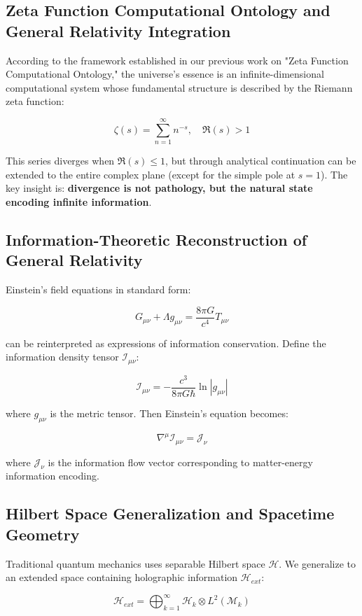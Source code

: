 \documentclass[12pt,a4paper]{article}
\begin{document}
\subsection{Zeta Function Computational Ontology and General Relativity Integration}

According to the framework established in our previous work on "Zeta Function Computational Ontology," the universe's essence is an infinite-dimensional computational system whose fundamental structure is described by the Riemann zeta function:

$$\zeta(s) = \sum_{n=1}^{\infty} n^{-s}, \quad \Re(s) > 1$$

This series diverges when $\Re(s) \leq 1$, but through analytical continuation can be extended to the entire complex plane (except for the simple pole at $s=1$). The key insight is: \textbf{divergence is not pathology, but the natural state encoding infinite information}.

\subsection{Information-Theoretic Reconstruction of General Relativity}

Einstein's field equations in standard form:

$$G_{\mu\nu} + \Lambda g_{\mu\nu} = \frac{8\pi G}{c^4} T_{\mu\nu}$$

can be reinterpreted as expressions of information conservation. Define the information density tensor $\mathcal{I}_{\mu\nu}$:

$$\mathcal{I}_{\mu\nu} = -\frac{c^3}{8\pi G\hbar} \ln|g_{\mu\nu}|$$

where $g_{\mu\nu}$ is the metric tensor. Then Einstein's equation becomes:

$$\nabla^\mu \mathcal{I}_{\mu\nu} = \mathcal{J}_\nu$$

where $\mathcal{J}_\nu$ is the information flow vector corresponding to matter-energy information encoding.

\subsection{Hilbert Space Generalization and Spacetime Geometry}

Traditional quantum mechanics uses separable Hilbert space $\mathcal{H}$. We generalize to an extended space containing holographic information $\mathcal{H}_{ext}$:

$$\mathcal{H}_{ext} = \bigoplus_{k=1}^{\infty} \mathcal{H}_k \otimes L^2(\mathcal{M}_k)$$
\end{document}
